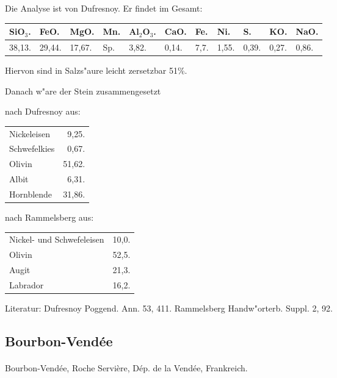 \documentclass[a4paper, 11pt, oneside]{article}
\begin{document}
Die Analyse ist von Dufresnoy. Er findet im Gesamt:
\begin{table}[!ht]
    \centering
    \footnotesize
    \begin{tabular}{l l l l l l l l l l l}
        SiO$_{3}$. & FeO. & MgO. & Mn. & Al$_{2}$O$_{3}$. & CaO. & Fe. & Ni. & S. & KO. & NaO. \\ \hline
        38,13. & 29,44. & 17,67. & Sp. & 3,82. & 0,14. & 7,7. & 1,55. & 0,39. & 0,27. & 0,86. \\
    \end{tabular}
\end{table}

Hiervon sind in Salzs"aure leicht zersetzbar 51\%.

Danach w"are der Stein zusammengesetzt
\begin{center}
nach Dufresnoy aus:
\end{center}
\begin{table}[!ht]
    \centering
    \begin{tabular}{l r}
        Nickeleisen & 9,25. \\
        Schwefelkies & 0,67. \\
        Olivin & 51,62. \\
        Albit & 6,31. \\
        Hornblende & 31,86. \\
    \end{tabular}
\end{table}
\begin{center}
nach Rammelsberg aus:
\end{center}
\begin{table}[!ht]
    \centering
    \begin{tabular}{l r}
        Nickel- und Schwefeleisen  & 10,0. \\
        Olivin & 52,5. \\
        Augit & 21,3. \\
        Labrador & 16,2. \\
    \end{tabular}
\end{table}

\footnotesize
Literatur: Dufresnoy Poggend. Ann. 53, 411. Rammelsberg Handw"orterb. Suppl. 2, 92.

\subsection{Bourbon-Vendée}
\normalsize
\paragraph{}
Bourbon-Vendée, Roche Servière, Dép. de la Vendée, Frankreich.
\end{document}
